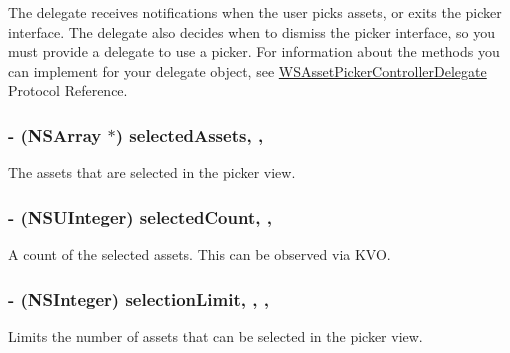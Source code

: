 The delegate receives notifications when the user picks assets, or exits the picker interface. The delegate also decides when to dismiss the picker interface, so you must provide a delegate to use a picker. For information about the methods you can implement for your delegate object, see \hyperlink{class_w_s_asset_picker_controller_delegate-p}{W\-S\-Asset\-Picker\-Controller\-Delegate} Protocol Reference. \hypertarget{interface_w_s_asset_picker_controller_a58fba39c716463bf32238bc097dbd24f}{
\subsubsection[{selected\-Assets}]{\setlength{\rightskip}{0pt plus 5cm}-\/ (N\-S\-Array $\ast$) selected\-Assets\hspace{0.3cm}{\ttfamily [read]}, {\ttfamily [nonatomic]}, {\ttfamily [assign]}}}\label{interface_w_s_asset_picker_controller_a58fba39c716463bf32238bc097dbd24f}
The assets that are selected in the picker view. \hypertarget{interface_w_s_asset_picker_controller_a8305dd6e54b82c02c0c62f180a50f767}{
\subsubsection[{selected\-Count}]{\setlength{\rightskip}{0pt plus 5cm}-\/ (N\-S\-U\-Integer) selected\-Count\hspace{0.3cm}{\ttfamily [read]}, {\ttfamily [nonatomic]}, {\ttfamily [assign]}}}\label{interface_w_s_asset_picker_controller_a8305dd6e54b82c02c0c62f180a50f767}
A count of the selected assets. This can be observed via K\-V\-O. \hypertarget{interface_w_s_asset_picker_controller_a3dca8005a42c04f30d500fa91b7a6837}{
\subsubsection[{selection\-Limit}]{\setlength{\rightskip}{0pt plus 5cm}-\/ (N\-S\-Integer) selection\-Limit\hspace{0.3cm}{\ttfamily [read]}, {\ttfamily [write]}, {\ttfamily [nonatomic]}, {\ttfamily [assign]}}}\label{interface_w_s_asset_picker_controller_a3dca8005a42c04f30d500fa91b7a6837}
Limits the number of assets that can be selected in the picker view. 

